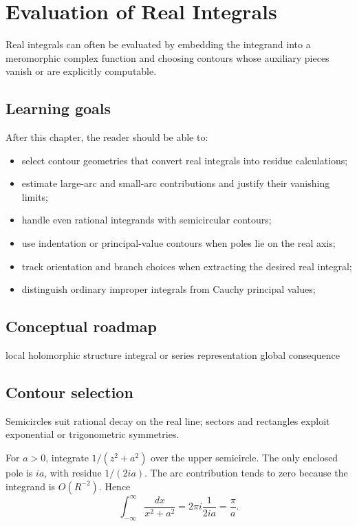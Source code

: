 \chapter{Evaluation of Real Integrals}
\label{ch:iv11}

Real integrals can often be evaluated by embedding the integrand into a meromorphic complex function and choosing contours whose auxiliary pieces vanish or are explicitly computable.

\section*{Learning goals}
After this chapter, the reader should be able to:
\begin{itemize}
\item select contour geometries that convert real integrals into residue calculations;
\item estimate large-arc and small-arc contributions and justify their vanishing limits;
\item handle even rational integrands with semicircular contours;
\item use indentation or principal-value contours when poles lie on the real axis;
\item track orientation and branch choices when extracting the desired real integral;
\item distinguish ordinary improper integrals from Cauchy principal values;
\end{itemize}
\section*{Conceptual roadmap}
\volroadmap
  {local holomorphic structure}
  {integral or series representation}
  {global consequence}

\section{Contour selection}
Semicircles suit rational decay on the real line; sectors and rectangles exploit exponential or trigonometric symmetries.

\begin{example}\label{ex:iv11-expand-01}
For \(a>0\), integrate \(1/(z^2+a^2)\) over the upper semicircle. The only enclosed pole is \(ia\), with residue \(1/(2ia)\). The arc contribution tends to zero because the integrand is \(O(R^{-2})\). Hence
\[
\int_{-\infty}^{\infty}\frac{dx}{x^2+a^2}=2\pi i\frac1{2ia}=\frac{\pi}{a}.
\]
\end{example}
